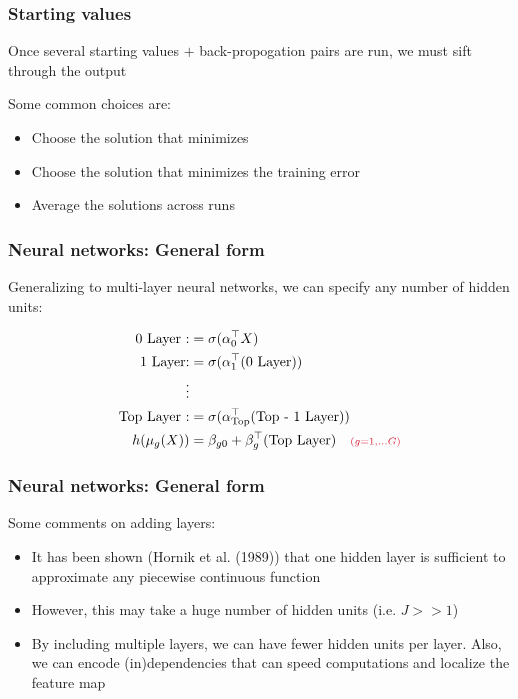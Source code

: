 \documentclass[12pt]{beamer}
\newcommand{\parenthetical}[2]{#1  \scriptstyle \alr{( #2)}}
\begin{document}
\begin{frame}[fragile]
\frametitle{Starting values}
Once several starting values $+$ back-propogation pairs are run, we must sift through the output

\vsp
Some common choices are:
\begin{itemize}
\item Choose the solution that minimizes 
\item Choose the solution that minimizes the  training error
\item Average the solutions across runs

\end{itemize}
\end{frame}

\begin{frame}[fragile]
\frametitle{Neural networks: General form}
Generalizing to multi-layer neural networks, we can specify any number of hidden units:

\begin{align*}
\textrm{0 Layer :} & = \sigma( \alpha_0^{\top}X) \\
\textrm{1 Layer:} &  = \sigma( \alpha_1^{\top}(\textrm{0 Layer})) \\
\vdots & \\
\textrm{Top Layer :} &  = \sigma( \alpha_{\textrm{Top} }^{\top}(\textrm{Top - 1 Layer})) \\
h(\mu_g(X)) & = \beta_{g0} + \beta_g^{\top}(\textrm{Top Layer}) \parenthetical{\quad}{g = 1, \ldots G}
\end{align*}

\end{frame}

\begin{frame}[fragile]
\frametitle{Neural networks: General form}
Some comments on adding layers:
\begin{itemize}
\item It has been shown (Hornik et al. (1989)) that one hidden layer is sufficient to approximate any piecewise continuous
function
\item However, this may take a huge number of hidden units (i.e. $J >> 1$)
\item By including multiple layers, we can have fewer hidden units per layer.  Also, we can encode (in)dependencies 
that can speed computations and localize the feature map
\end{itemize}
\end{frame}
\end{document}
